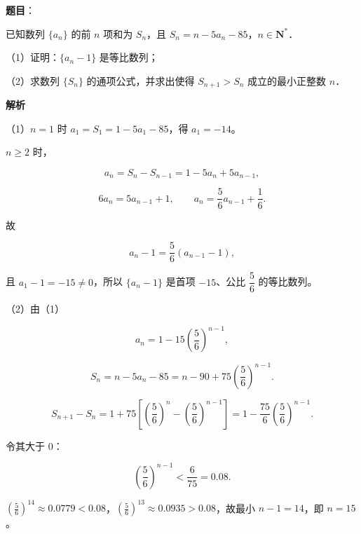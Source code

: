 \begin{answer}

\textbf{题目}：

已知数列 $\{a_n\}$ 的前 $n$ 项和为 $S_n$，且 $S_n=n-5a_n-85$，$n\in\mathbf N^*$．

（1）证明：$\{a_n-1\}$ 是等比数列；

（2）求数列 $\{S_n\}$ 的通项公式，并求出使得 $S_{n+1}>S_n$ 成立的最小正整数 $n$．

\textbf{解析}

（1）$n=1$ 时 $a_1=S_1=1-5a_1-85$，得 $a_1=-14$。

$n\geqslant2$ 时，

\nopagebreak[4]
\[a_n=S_n-S_{n-1}
=1-5a_n+5a_{n-1},\]

\nopagebreak[4]
\[6a_n=5a_{n-1}+1,\qquad a_n=\frac56a_{n-1}+\frac16.\]

故

\nopagebreak[4]
\[a_n-1=\frac56(a_{n-1}-1),\]

且 $a_1-1=-15\neq0$，所以 $\{a_n-1\}$ 是首项 $-15$、公比 $\dfrac56$ 的等比数列。

（2）由（1）

\nopagebreak[4]
\[a_n=1-15\left(\frac56\right)^{n-1},\]

\nopagebreak[4]
\[S_n=n-5a_n-85
=n-90+75\left(\frac56\right)^{n-1}.\]

\nopagebreak[4]
\[S_{n+1}-S_n=1+75\left[\left(\frac56\right)^n-\left(\frac56\right)^{n-1}\right]
=1-\frac{75}6\left(\frac56\right)^{n-1}.\]

令其大于 $0$：

\nopagebreak[4]
\[\left(\frac56\right)^{n-1}<\frac6{75}=0.08.\]

$\left(\frac56\right)^{14}\approx0.0779<0.08$，$\left(\frac56\right)^{13}\approx0.0935>0.08$，故最小 $n-1=14$，即 $n=15$。


\end{answer}
